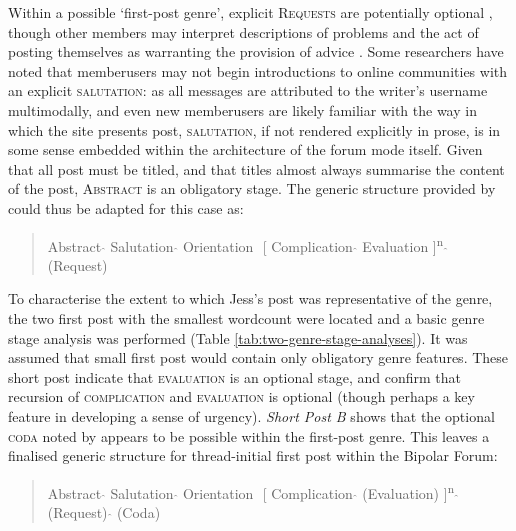 \documentclass{article}
\renewcommand{\cite}{\parencite}
\begin{document}
{Within a possible `first-post genre', explicit \textsc{Requests} are potentially optional \cite{vayreda_social_2009}, though other members may interpret descriptions of problems and the act of posting themselves as warranting the provision of advice \cite{goldsmith2000soliciting}. Some researchers \cite[e.g. ][]{herring_two_1996,weber_missed_2011} have noted that member{users} may not begin introductions to online communities with an explicit \textsc{salutation}: as all messages are attributed to the writer's username multimodally, and even new member{users} are likely familiar with the way in which the site presents post, \textsc{salutation}, if not rendered explicitly in prose, is in some sense embedded within the architecture of the forum mode itself. Given that all post must be titled, and that titles almost always summarise the content of the post, \textsc{Abstract} is an obligatory stage. The generic structure provided by \textcite{labov_narrative_1997} could thus be adapted for this case as:

\begin{quotation}\small
\noindent Abstract $\hat{}$ Salutation $\hat{}$ Orientation $\hat{}$ [ Complication $\hat{}$ Evaluation ]\textsuperscript{n} $\hat{}$ (Request)
\end{quotation}
%
To characterise the extent to which Jess's post was representative of the genre, the two first post with the smallest wordcount were located and a basic genre stage analysis was performed (Table \ref{tab:two-genre-stage-analyses}). It was assumed that small first post would contain only obligatory genre features. These short post indicate that \textsc{evaluation} is an optional stage, and confirm that recursion of \textsc{complication} and \textsc{evaluation} is optional (though perhaps a key feature in developing a sense of urgency). \emph{Short Post B} shows that the optional \textsc{coda} noted by \textcite{labov_narrative_1997} appears to be possible within the first-post genre. This leaves a finalised generic structure for thread-initial first post within the Bipolar Forum:

\begin{quotation}\small
\noindent Abstract $\hat{}$ Salutation $\hat{}$ Orientation $\hat{}$ [ Complication $\hat{}$ (Evaluation) ]\textsuperscript{n} $\hat{}$ (Request) $\hat{}$ (Coda)
\end{quotation}

}
\end{document}
